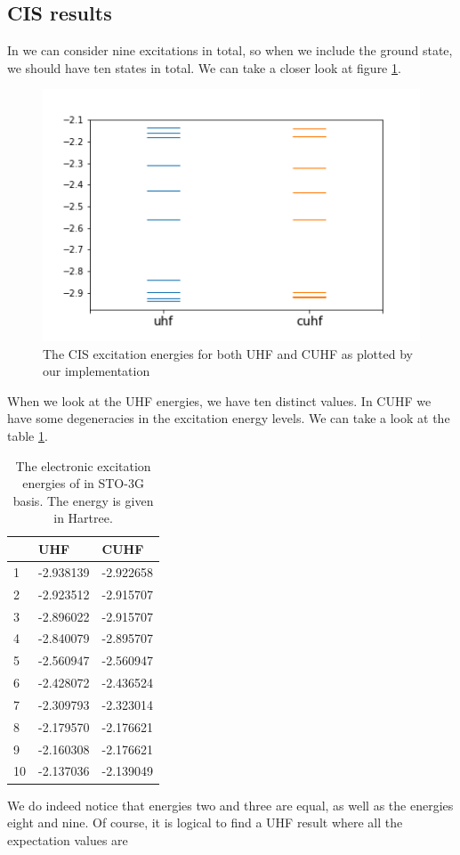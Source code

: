 \subsection{CIS results}
\label{subsec:cis}
In  we can consider nine excitations in total, so when we include the ground state, we should have ten states in total. We can take a closer look at
figure \ref{fig:h3_cis}.
\begin{center}
  \begin{figure}[H]
    \centering
    \includegraphics[width=0.5\linewidth]{./img/h3_cis.png}
    \caption{The CIS excitation energies for both UHF and CUHF as plotted by our implementation}
    \label{fig:h3_cis}
  \end{figure}
\end{center}
When we look at the UHF energies, we have ten distinct values. In CUHF we have some degeneracies in the excitation energy levels.
We can take a look at the table \ref{tab:excits}.
\begin{table}[H]
  \caption{The electronic excitation energies of  in STO-3G basis. The energy is given in Hartree.}
  \label{tab:excits}
  \begin{tabular}{l|l|l}
       & UHF       & CUHF      \\
    \hline
    1  & -2.938139 & -2.922658 \\
    2  & -2.923512 & -2.915707 \\
    3  & -2.896022 & -2.915707 \\
    4  & -2.840079 & -2.895707 \\
    5  & -2.560947 & -2.560947 \\
    6  & -2.428072 & -2.436524 \\
    7  & -2.309793 & -2.323014 \\
    8  & -2.179570 & -2.176621 \\
    9  & -2.160308 & -2.176621 \\
    10 & -2.137036 & -2.139049
  \end{tabular}
\end{table}
We do indeed notice that energies two and three are equal, as well as the energies eight and nine. Of course, it is logical to find a UHF result where all the expectation values are
